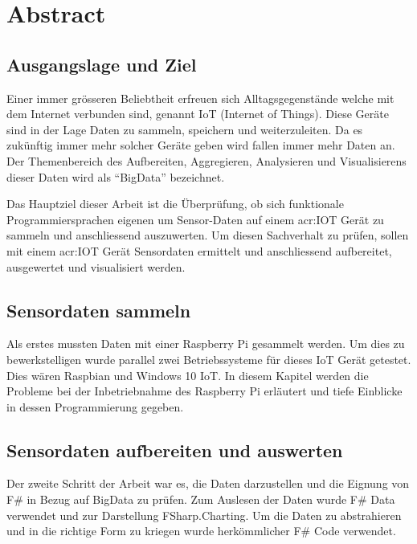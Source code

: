 
\section*{Abstract}

\subsection*{Ausgangslage und Ziel}
Einer immer grösseren Beliebtheit erfreuen sich Alltagsgegenstände welche mit dem Internet verbunden sind, genannt IoT (Internet of Things). Diese Geräte sind in der Lage Daten zu sammeln, speichern und weiterzuleiten. Da es zukünftig immer mehr solcher Geräte geben wird fallen immer mehr Daten an. Der Themenbereich des Aufbereiten, Aggregieren, Analysieren und Visualisierens dieser Daten wird als "`BigData"' bezeichnet.

Das Hauptziel dieser Arbeit ist die Überprüfung, ob sich funktionale Programmiersprachen eigenen um Sensor-Daten auf einem \gls{acr:IOT} Gerät zu sammeln und anschliessend auszuwerten. Um diesen Sachverhalt zu prüfen, sollen mit einem \gls{acr:IOT} Gerät Sensordaten ermittelt und anschliessend aufbereitet, ausgewertet und visualisiert werden.

\subsection*{Sensordaten sammeln}
Als erstes mussten Daten mit einer Raspberry Pi gesammelt werden. Um dies zu bewerkstelligen wurde parallel zwei Betriebssysteme für dieses IoT Gerät getestet. Dies wären Raspbian und Windows 10 IoT. In diesem Kapitel werden die Probleme bei der Inbetriebnahme des Raspberry Pi erläutert und tiefe Einblicke in dessen Programmierung gegeben.

\subsection*{Sensordaten aufbereiten und auswerten}
Der zweite Schritt der Arbeit war es, die Daten darzustellen und die Eignung von F\# in Bezug auf BigData zu prüfen. Zum Auslesen der Daten wurde F\# Data verwendet und zur Darstellung FSharp.Charting. Um die Daten zu abstrahieren und in die richtige Form zu kriegen wurde herkömmlicher F\# Code verwendet.

